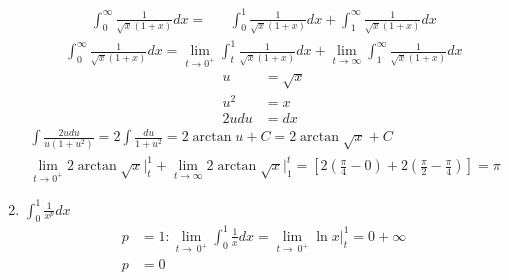 \documentclass[12pt]{article}
\begin{document}
\begin{enumerate}
    \begin{align*}
        \int_0^\infty\frac{1}{\sqrt{x}(1+x)}dx = && 
        \int_0^1\frac{1}{\sqrt{x}(1+x)}dx + 
        \int_1^\infty\frac{1}{\sqrt{x}(1+x)}dx
    \end{align*}
    \begin{align*}
        \int_0^\infty\frac{1}{\sqrt{x}(1+x)}dx=\lim_{t\to 0^+}\int_t^1\frac{1}{\sqrt{x}(1+x)}dx+
        \lim_{t\to \infty}\int_1^\infty\frac{1}{\sqrt{x}(1+x)}dx
    \end{align*}
    \begin{align*}
        u &= \sqrt{x}
        \\ u^2 &= x
        \\2udu &= dx
    \end{align*}
    \begin{align*}
        \int\frac{2udu}{u(1+u^2)} = 2\int\frac{du}{1+u^2} = 2\arctan u + C = 2\arctan \sqrt{x} + C \\
        \lim_{t\to 0^+} 2\arctan\sqrt{x} \bigg|_t^1 + 
        \lim_{t\to \infty} 2\arctan\sqrt{x} \bigg|_1^t = \left[2\left(\frac{\pi}{4}-0\right) + 2\left(\frac{\pi}{2}-\frac{\pi}{4}\right)\right] = \pi
    \end{align*}
    \newpage\addtocounter{enumi}{1}\item $\int_0^1\frac{1}{x^p}dx$
    \begin{align*}
        p &= 1: \lim_{t\to\ 0^+}\int_0^1\frac{1}{x}dx = \lim_{t\to\ 0^+} \ln{x}\bigg|_t^1 = 0 + \infty \\
        p &= 0
    \end{align*}
\end{enumerate}
\end{document}
